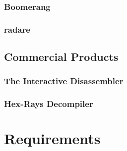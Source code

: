 \documentclass[12pt, a4paper]{article}
\begin{document}

\subsubsection{Boomerang}

\cite{boomerang}


\subsubsection{radare}

\cite{radare}


\subsection{Commercial Products}



\subsubsection{The Interactive Disassembler}


\subsubsection{Hex-Rays Decompiler}



\section{Requirements}

\end{document}
